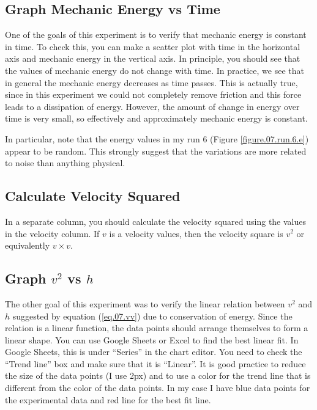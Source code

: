 \subsection{Graph Mechanic Energy vs Time}
One of the goals of this experiment is to verify that mechanic energy is constant in time. To check this, you can make a scatter plot with time in the horizontal axis and mechanic energy in the vertical axis. In principle, you should see that the values of mechanic energy do not change with time. In practice, we see that in general the mechanic energy decreases as time passes. This is actually true, since in this experiment we could not completely remove friction and this force leads to a dissipation of energy. However, the amount of change in energy over time is very small, so effectively and approximately mechanic energy is constant.

In particular, note that the energy values in my run 6 (Figure \ref{figure.07.run.6.e}) appear to be random. This strongly suggest that the variations are more related to noise than anything physical.
\subsection{Calculate Velocity Squared}
In a separate column, you should calculate the velocity squared using the values in the velocity column. If $v$ is a velocity values, then the velocity square is $v^2$ or equivalently $v \times v$.
\subsection{Graph $v^2$ vs $h$}
The other goal of this experiment was to verify the linear relation between $v^{2}$ and $h$ suggested by equation (\ref{eq.07.vv}) due to conservation of energy. Since the relation is a linear function, the data points should arrange themselves to form a linear shape. You can use Google Sheets or Excel to find the best linear fit. In Google Sheets, this is under ``Series'' in the chart editor. You need to check the ``Trend line'' box and make sure that it is ``Linear''. It is good practice to reduce the size of the data points (I use 2px) and to use a color for the trend line that is different from the color of the data points. In my case I have blue data points for the experimental data and red line for the best fit line.

